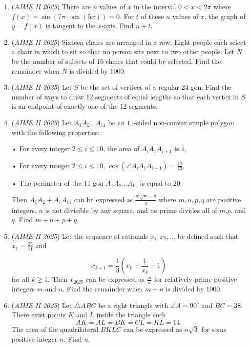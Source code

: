\begin{enumerate}
 

	\item (\textit{AIME II 2025}) There are $n$ values of $x$ in the interval $0<x<2\pi$ where $f(x)=\sin(7\pi\cdot\sin(5x))=0$. For $t$ of these $n$ values of $x$, the graph of $y=f(x)$ is tangent to the $x$-axis. Find $n+t$.


 

	\item (\textit{AIME II 2025}) Sixteen chairs are arranged in a row. Eight people each select a chair in which to sit so that no person sits next to two other people. Let $N$ be the number of subsets of $16$ chairs that could be selected. Find the remainder when $N$ is divided by $1000$.


 

	\item (\textit{AIME II 2025}) Let $S$ be the set of vertices of a regular $24$-gon. Find the number of ways to draw $12$ segments of equal lengths so that each vertex in $S$ is an endpoint of exactly one of the $12$ segments.


 

	\item (\textit{AIME II 2025}) Let $A_1A_2\dots A_{11}$ be an $11$-sided non-convex simple polygon with the following properties:


 • For every integer $2 \leq i \leq 10$, the area of $A_iA_1A_{i+1}$ is $1$,


 • For every integer $2 \leq i \leq 10$, $\cos(\angle A_iA_1A_{i+1})=\frac{12}{13}$,


 • The perimeter of the $11$-gon $A_1A_2\dots A_{11}$ is equal to $20$.


 Then $A_1A_2+A_1A_{11}$ can be expressed as $\frac{m\sqrt{n}-p}{q}$ where $m,n,p,q$ are positive integers, $n$ is not divisible by any square, and no prime divides all of $m$,$p$, and $q$. Find $m+n+p+q$.


 

	\item (\textit{AIME II 2025}) Let the sequence of rationals $x_1,x_2,\dots$ be defined such that $x_1=\frac{25}{11}$ and

 \[x_{k+1}=\frac{1}{3}\left(x_k+\frac{1}{x_k}-1\right)\] for all $k \geq 1$. Then $x_{2025}$ can be expressed as $\frac{m}{n}$ for relatively prime positive integers $m$ and $n$. Find the remainder when $m+n$ is divided by $1000$.


 

	\item (\textit{AIME II 2025}) Let ${\triangle ABC}$ be a right triangle with $\angle A = 90^\circ$ and $BC = 38.$ There exist points $K$ and $L$ inside the triangle such
 \[AK = AL = BK = CL = KL = 14.\]The area of the quadrilateral $BKLC$ can be expressed as $n\sqrt3$ for some positive integer $n.$ Find $n.$



\end{enumerate}
